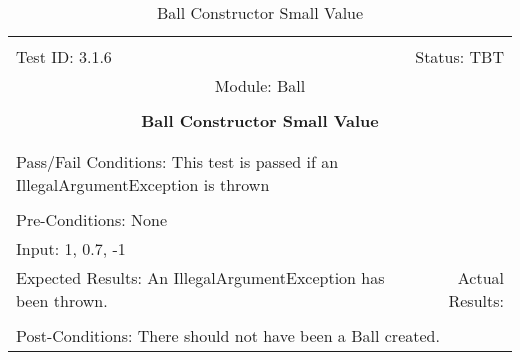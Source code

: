 \documentclass[titlepage]{article}
\begin{document}
\begin{center}%
\begin{table}
\begin{tabular}{|l r|}\hline&\\[-2mm]
	Test ID: 3.1.6	&Status: TBT\\[-3mm]
	\multicolumn{2}{|c|}{Module: Ball}\\&\\
	\multicolumn{2}{|c|}{\textbf{\large{Ball Constructor Small Value}}}\\&\\\hline&\\[-3mm]
	\multicolumn{2}{|p{\textwidth}|}{Pass/Fail Conditions: This test is passed if an IllegalArgumentException is thrown}\\[1mm]\hline&\\[-3mm]
	\multicolumn{2}{|p{\textwidth}|}{Pre-Conditions: None}\\[4mm]
	\multicolumn{2}{|p{\textwidth}|}{Input: 1, 0.7, -1}\\[2mm]\hline
	\multicolumn{1}{|p{0.49\textwidth}}{Expected Results: An IllegalArgumentException has been thrown.}	&\multicolumn{1}{|p{0.45\textwidth}|}{Actual Results:}\\\hline&\\[-3mm]
	\multicolumn{2}{|p{\textwidth}|}{Post-Conditions: There should not have been a Ball created.}\\\hline
\end{tabular}
\caption{Ball Constructor Small Value}
\end{table}
\end{center}
\end{document}
